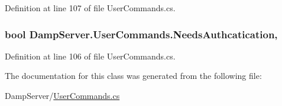 Definition at line 107 of file User\-Commands.\-cs.

\hypertarget{class_damp_server_1_1_user_commands_ae868b059adcb74a836a6a5803613ce98}{
\subsubsection[{Needs\-Authcatication}]{\setlength{\rightskip}{0pt plus 5cm}bool Damp\-Server.\-User\-Commands.\-Needs\-Authcatication\hspace{0.3cm}{\ttfamily [get]}, {\ttfamily [set]}}}\label{class_damp_server_1_1_user_commands_ae868b059adcb74a836a6a5803613ce98}


Definition at line 106 of file User\-Commands.\-cs.



The documentation for this class was generated from the following file\-:\begin{DoxyCompactItemize}
\item 
Damp\-Server/\hyperlink{_user_commands_8cs}{User\-Commands.\-cs}\end{DoxyCompactItemize}
